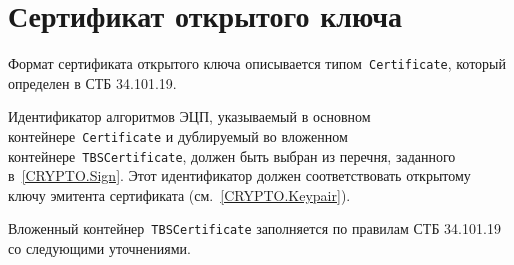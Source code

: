 \section{Сертификат открытого ключа}\label{FMT.Cert}

Формат сертификата открытого ключа описывается типом~\texttt{Certificate}, 
который определен в СТБ 34.101.19.

Идентификатор алгоритмов ЭЦП, указываемый в основном
контейнере~\texttt{Certificate} и  дублируемый во вложенном
контейнере~\texttt{TBSCertificate}, должен быть выбран из перечня,
заданного в~\ref{CRYPTO.Sign}. Этот идентификатор должен соответствовать
открытому ключу эмитента сертификата (см.~\ref{CRYPTO.Keypair}).

Вложенный контейнер~\texttt{TBSCertificate} заполняется по правилам СТБ 
34.101.19 со следующими уточнениями.
